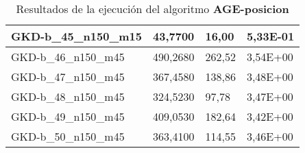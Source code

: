 \begin{table}[!ht]
\begin{adjustbox}{height=12cm}
\begin{tabular}{|l|l|l|l|}
		GKD-b\_45\_n150\_m15 & 43,7700  & 16,00         & 5,33E-01 \\ \hline
		GKD-b\_46\_n150\_m45 & 490,2680 & 262,52        & 3,54E+00 \\ \hline
		GKD-b\_47\_n150\_m45 & 367,4580 & 138,86        & 3,48E+00 \\ \hline
		GKD-b\_48\_n150\_m45 & 324,5230 & 97,78         & 3,47E+00 \\ \hline
		GKD-b\_49\_n150\_m45 & 409,0530 & 182,64        & 3,42E+00 \\ \hline
		GKD-b\_50\_n150\_m45 & 363,4100 & 114,55        & 3,46E+00 \\ \hline
    \end{tabular}
    \end{adjustbox}
    \caption{Resultados de la ejecución del algoritmo \textbf{AGE-posicion}}
\end{table}

\pagebreak